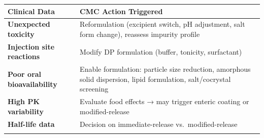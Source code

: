 \documentclass[
  11pt,
  a4paper,
]{report}
\begin{document}
\begin{longtable}[]{@{}ll@{}}
\toprule
\begin{minipage}[b]{0.39\columnwidth}\raggedright
Clinical Data\strut
\end{minipage} & \begin{minipage}[b]{0.55\columnwidth}\raggedright
CMC Action Triggered\strut
\end{minipage}\tabularnewline
\midrule
\endhead
\begin{minipage}[t]{0.39\columnwidth}\raggedright
\textbf{Unexpected toxicity}\strut
\end{minipage} & \begin{minipage}[t]{0.55\columnwidth}\raggedright
Reformulation (excipient switch, pH adjustment, salt form change),
reassess impurity profile\strut
\end{minipage}\tabularnewline
\begin{minipage}[t]{0.39\columnwidth}\raggedright
\textbf{Injection site reactions}\strut
\end{minipage} & \begin{minipage}[t]{0.55\columnwidth}\raggedright
Modify DP formulation (buffer, tonicity, surfactant)\strut
\end{minipage}\tabularnewline
\begin{minipage}[t]{0.39\columnwidth}\raggedright
\textbf{Poor oral bioavailability}\strut
\end{minipage} & \begin{minipage}[t]{0.55\columnwidth}\raggedright
Enable formulation: particle size reduction, amorphous solid dispersion,
lipid formulation, salt/cocrystal screening\strut
\end{minipage}\tabularnewline
\begin{minipage}[t]{0.39\columnwidth}\raggedright
\textbf{High PK variability}\strut
\end{minipage} & \begin{minipage}[t]{0.55\columnwidth}\raggedright
Evaluate food effects → may trigger enteric coating or
modified-release\strut
\end{minipage}\tabularnewline
\begin{minipage}[t]{0.39\columnwidth}\raggedright
\textbf{Half-life data}\strut
\end{minipage} & \begin{minipage}[t]{0.55\columnwidth}\raggedright
Decision on immediate-release vs.~modified-release\strut
\end{minipage}\tabularnewline
\begin{minipage}[t]{0.39\columnwidth}\raggedright

\end{minipage}
\end{longtable}
\end{document}
